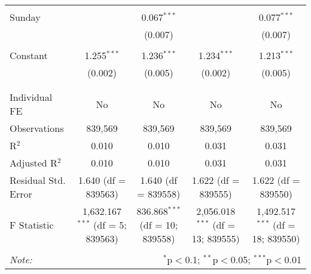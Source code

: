 \documentclass[
]{article}
\begin{document}
\begin{table}[!htbp]
{\begin{tabular}{@{\extracolsep{5pt}}lcccc}
  & & & & \\ 
 Sunday &  & 0.067$^{***}$ &  & 0.077$^{***}$ \\ 
  &  & (0.007) &  & (0.007) \\ 
  & & & & \\ 
 Constant & 1.255$^{***}$ & 1.236$^{***}$ & 1.234$^{***}$ & 1.213$^{***}$ \\ 
  & (0.002) & (0.005) & (0.002) & (0.005) \\ 
  & & & & \\ 
\hline \\[-1.8ex] 
Individual FE & No & No & No & No \\ 
Observations & 839,569 & 839,569 & 839,569 & 839,569 \\ 
R$^{2}$ & 0.010 & 0.010 & 0.031 & 0.031 \\ 
Adjusted R$^{2}$ & 0.010 & 0.010 & 0.031 & 0.031 \\ 
Residual Std. Error & 1.640 (df = 839563) & 1.640 (df = 839558) & 1.622 (df = 839555) & 1.622 (df = 839550) \\ 
F Statistic & 1,632.167$^{***}$ (df = 5; 839563) & 836.868$^{***}$ (df = 10; 839558) & 2,056.018$^{***}$ (df = 13; 839555) & 1,492.517$^{***}$ (df = 18; 839550) \\ 
\hline 
\hline \\[-1.8ex] 
\textit{Note:}  & \multicolumn{4}{r}{$^{*}$p$<$0.1; $^{**}$p$<$0.05; $^{***}$p$<$0.01} \\ 
\end{tabular}
} 
\end{table} 
\newpage
\end{document}
